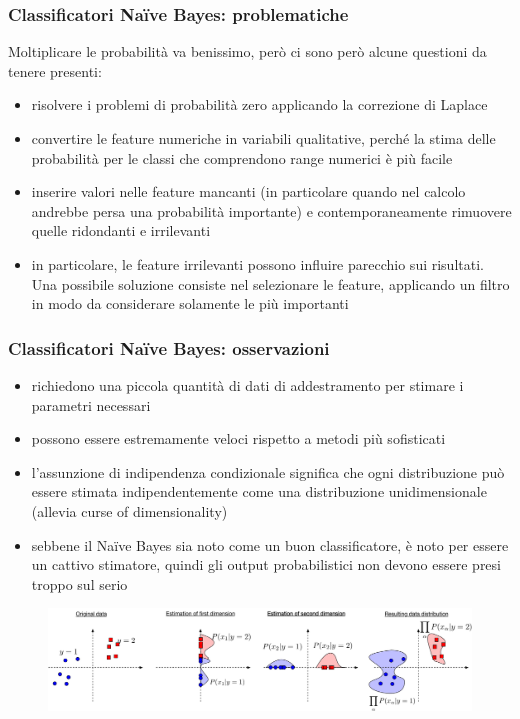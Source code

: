 \begin{frame}
	
	\frametitle{Classificatori Naïve Bayes: problematiche}
	
	Moltiplicare le probabilità va benissimo, però ci sono però alcune questioni da tenere presenti:
	\begin{itemize}
		\item risolvere i problemi di probabilità zero applicando la correzione di Laplace
		\item convertire le feature numeriche in variabili qualitative, perché la stima delle probabilità per le classi che comprendono range numerici è più facile
		\item inserire valori nelle feature mancanti (in particolare quando nel calcolo andrebbe persa una probabilità importante) e contemporaneamente rimuovere quelle ridondanti e irrilevanti
		\item in particolare, le feature irrilevanti possono influire parecchio sui risultati. Una possibile soluzione consiste nel selezionare le feature, applicando un filtro in modo da considerare solamente le più importanti
	\end{itemize}
\end{frame}


\begin{frame}
	
	\frametitle{Classificatori Naïve Bayes: osservazioni}
	
	\begin{itemize}
		\item richiedono una piccola quantità di dati di addestramento per stimare i parametri necessari
		\item possono essere estremamente veloci rispetto a metodi più sofisticati
		\item l'assunzione di indipendenza condizionale significa che ogni distribuzione può essere stimata indipendentemente come una distribuzione unidimensionale (allevia curse of dimensionality)
		\item sebbene il Naïve Bayes sia noto come un buon classificatore, è noto per essere un cattivo stimatore, quindi gli output probabilistici non devono essere presi troppo sul serio
	\end{itemize}	
	
	\begin{figure}[!htbp]
		\centering
		\includegraphics[width=0.95\linewidth]{images/supervised/naive_bayes/NBschematic.png}
	\end{figure}
%	
%	
\end{frame}